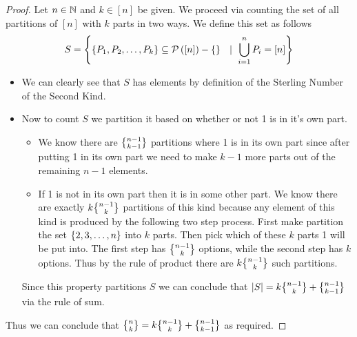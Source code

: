         \begin{proof}
            Let $n \in \mathbb{N}$ and $k \in [n]$ be given.
            We proceed via counting the set of all partitions of $[n]$ with $k$ parts
            in two ways. We define this set as follows
            \[
                S = \left\{\left\{P_1, P_2, \dots, P_k\right\} \subseteq \mathcal{P}\left([n]\right) - \left\{\right\} \  \ \mid \ \displaystyle\bigcup_{i = 1}^{n} P_i = [n]\right\}
            \]
            \begin{itemize}
                \item
                    We can clearly see that $S$ has  elements by definition of
                    the Sterling Number of the Second Kind.
                \item
                    Now to count $S$ we partition it based on whether or not 1 is in
                    it's own part.
                    \begin{itemize}
                        \item 
                            We know there are $\npartk{n - 1}{k - 1}$ partitions
                            where 1 is in its own part since after putting 1 in its own part we need
                            to make $k - 1$ more parts out of the remaining $n - 1$ elements.
                        \item
                            If 1 is not in its own part then it is in some other part. We
                            know there are exactly $k \npartk{n - 1}{k}$ partitions of this
                            kind because any element of this kind is produced by the following
                            two step process. First make partition the set $\left\{2, 3, \dots, n\right\}$
                            into $k$ parts. Then pick which of these $k$ parts 1 will be put into.
                            The first step has $\npartk{n - 1}{k}$ options, while the second step
                            has $k$ options. Thus by the rule of product there are $k \npartk{n - 1}{k}$
                            such partitions.
                    \end{itemize}
                    Since this property partitions $S$ we can conclude that     
                    $|S| = k \npartk{n - 1}{k} + \npartk{n - 1}{k - 1}$ via the rule of sum.
            \end{itemize}
            Thus we can conclude that $\npartk{n}{k} = k \npartk{n - 1}{k} + \npartk{n - 1}{k - 1}$
            as required. \QED
        \end{proof}
